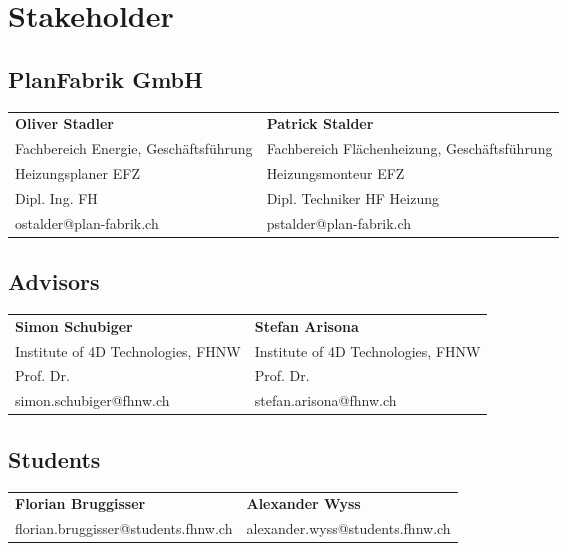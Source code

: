 \chapter{Stakeholder}
\section{PlanFabrik GmbH}

\begin{tabular}{L{6cm}  L{6cm}}
\textbf{Oliver Stadler} & \textbf{Patrick Stalder} \\
Fachbereich Energie, Geschäftsführung & Fachbereich Flächenheizung, Geschäftsführung \\
Heizungsplaner EFZ & Heizungsmonteur EFZ \\
Dipl. Ing. FH & Dipl. Techniker HF Heizung \\ 
ostalder@plan-fabrik.ch & pstalder@plan-fabrik.ch
\end{tabular}

\section{Advisors}

\begin{tabular}{L{6cm}  L{6cm}}
	\textbf{Simon Schubiger} & \textbf{Stefan Arisona} \\
	Institute of 4D Technologies, FHNW & Institute of 4D Technologies, FHNW \\
	Prof. Dr. & Prof. Dr.\\
	simon.schubiger@fhnw.ch & stefan.arisona@fhnw.ch
\end{tabular}

\section{Students}

\begin{tabular}{L{6cm}  L{6cm}}
	\textbf{Florian Bruggisser} & \textbf{Alexander Wyss} \\
	florian.bruggisser@students.fhnw.ch & alexander.wyss@students.fhnw.ch
\end{tabular}